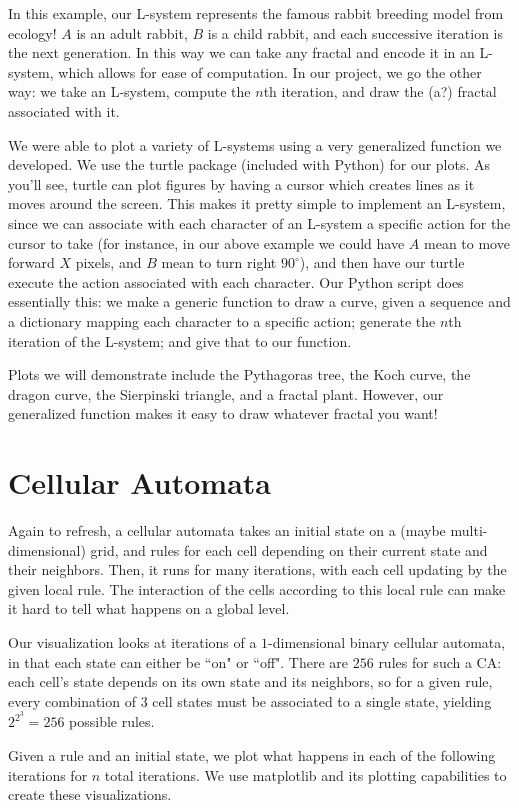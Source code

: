 \documentclass[a4paper,11pt]{article}
\theoremstyle{quest}
\begin{document}
In this example, our L-system represents the famous rabbit breeding model from ecology! $A$ is an adult rabbit, $B$ is a child rabbit, and each successive iteration is the next generation. In this way we can take any fractal and encode it in an L-system, which allows for ease of computation. In our project, we go the other way: we take an L-system, compute the $n$th iteration, and draw the (a?) fractal associated with it.

We were able to plot a variety of L-systems using a very generalized function we developed. We use the turtle package (included with Python) for our plots. As you'll see, turtle can plot figures by having a cursor which creates lines as it moves around the screen. This makes it pretty simple to implement an L-system, since we can associate with each character of an L-system a specific action for the cursor to take (for instance, in our above example we could have $A$ mean to move forward $X$ pixels, and $B$ mean to turn right $90^\circ$), and then have our turtle execute the action associated with each character. Our Python script does essentially this: we make a generic function to draw a curve, given a sequence and a dictionary mapping each character to a specific action; generate the $n$th iteration of the L-system; and give that to our function.

Plots we will demonstrate include the Pythagoras tree, the Koch curve, the dragon curve, the Sierpinski triangle, and a fractal plant. However, our generalized function makes it easy to draw whatever fractal you want!

\section{Cellular Automata}

Again to refresh, a cellular automata takes an initial state on a (maybe multi-dimensional) grid, and rules for each cell depending on their current state and their neighbors. Then, it runs for many iterations, with each cell updating by the given local rule. The interaction of the cells according to this local rule can make it hard to tell what happens on a global level. 

Our visualization looks at iterations of a $1$-dimensional binary cellular automata, in that each state can either be ``on" or ``off". There are $256$ rules for such a CA: each cell's state depends on its own state and its neighbors, so for a given rule, every combination of $3$ cell states must be associated to a single state, yielding $2^{2^3} = 256$ possible rules. 

Given a rule and an initial state, we plot what happens in each of the following iterations for $n$ total iterations. We use matplotlib and its plotting capabilities to create these visualizations. 
\end{document}
